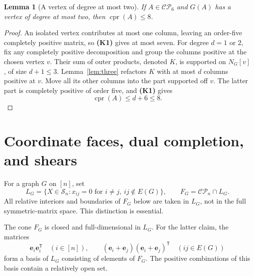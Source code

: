 \documentclass[11pt,a4paper]{article}
\newtheorem{lemma}[theorem]{Lemma}
\theoremstyle{definition}
\newcommand{\CP}{\mathcal{CP}}
\DeclareMathOperator{\cpr}{cpr}
\newcommand{\ee}{\mathbf e}
\newcommand{\T}{\mathsf T}
\newcommand{\inputfact}[1]{\textbf{(#1)}}
\begin{document}
\begin{lemma}[A vertex of degree at most two]\label{lem:lowdegree}
If $A\in\CP_6$ and $G(A)$ has a vertex of degree at most two, then $\cpr(A)\leq8$.
\end{lemma}
\begin{proof}
An isolated vertex contributes at most one column, leaving an order-five completely positive matrix, so \inputfact{K1} gives at most seven. For degree $d=1$ or $2$, fix any completely positive decomposition and group the columns positive at the chosen vertex $v$. Their sum of outer products, denoted $K$, is supported on $N_G[v]$, of size $d+1\leq3$. Lemma~\ref{lem:three} refactors $K$ with at most $d$ columns positive at $v$. Move all its other columns into the part supported off $v$. The latter part is completely positive of order five, and \inputfact{K1} gives
\[
 \cpr(A)\leq d+6\leq8.
\]
\end{proof}

\section{Coordinate faces, dual completion, and shears}

For a graph $G$ on $[n]$, set
\[
 L_G=\{X\in\mathcal S_n:x_{ij}=0\text{ for }i\ne j,\ ij\notin E(G)\},
 \qquad F_G=\CP_n\cap L_G.
\]
All relative interiors and boundaries of $F_G$ below are taken in $L_G$, not in the full symmetric-matrix space. This distinction is essential.

The cone $F_G$ is closed and full-dimensional in $L_G$. For the latter claim, the matrices
\[
 \ee_i\ee_i^{\T}\quad(i\in[n]),\qquad
 (\ee_i+\ee_j)(\ee_i+\ee_j)^{\T}\quad(ij\in E(G))
\]
form a basis of $L_G$ consisting of elements of $F_G$. The positive combinations of this basis contain a relatively open set.
\end{document}
